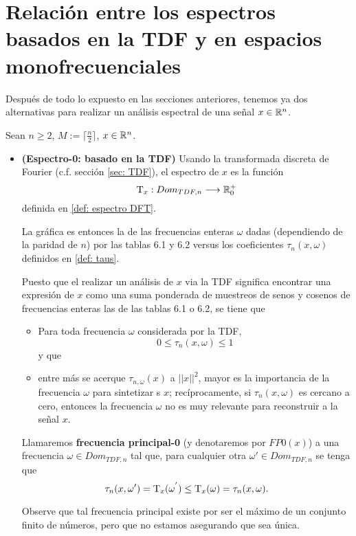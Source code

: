 \section{Relación entre los espectros basados en la TDF y en espacios monofrecuenciales}

Después de todo lo expuesto en las secciones anteriores, tenemos
ya dos alternativas para realizar un análisis
espectral de una señal $x \in \mathbb{R}^{n}$.

Sean $n \geq 2$, $M := \lceil \frac{n}{2} \rceil$, $x \in \mathbb{R}^{n}$.
\begin{itemize}
	\item \textbf{(Espectro-0: basado en la TDF)} 
	Usando la transformada discreta de Fourier
	(c.f. sección \ref{sec: TDF}),
	el espectro de $x$ es la función
	\[
	\mathrm{T}_{x}: Dom_{TDF, n} \longrightarrow \mathbb{R}^{+}_{0}
	\]	
	definida en \ref{def: espectro DFT}.
	
	La gráfica es entonces la de las frecuencias
	enteras $\omega$ dadas (dependiendo de la 
	paridad de $n$) por las
	tablas 6.1 y 6.2
	versus los coeficientes
	$\tau_{n}(x, \omega)$ definidos en
	\ref{def: taus}.
	
	Puesto que el realizar un análisis de 
	$x$ via la TDF significa encontrar una
	expresión de $x$ como una suma
	ponderada de muestreos de senos y cosenos
	de frecuencias enteras las de las tablas 6.1 o 6.2,
	se tiene que  
	\begin{itemize}
		\item Para toda frecuencia $\omega$ considerada
		por la TDF,
		\[
		0 \leq \tau_{n}(x, \omega) \leq 1
		\]
		y que
		\item entre más se acerque
		$\tau_{n, \omega}(x)$
		a $|| x ||^{2}$, mayor es la
		importancia de la frecuencia $\omega$ para
		sintetizar s $x$; recíprocamente, si 
		$\tau_{n}(x, \omega)$ es cercano a cero, entonces
		la frecuencia $\omega$ no es muy relevante para 
		reconstruir a la señal $x$.
	\end{itemize}
	\begin{defi}
	\label{def: FM0}
	Llamaremos \textbf{frecuencia principal-0}
	(y denotaremos por $FP0(x)$) 
	a una 
	frecuencia $\omega \in Dom_{TDF, n}$
	tal que, para cualquier otra $\omega' \in Dom_{TDF, n}$ 
	se tenga que 
	\[
	\tau_{n}(x, \omega') = \mathrm{T}_{x}(\omega^{'}) \leq
	\mathrm{T}_{x}(\omega) =  
	 \tau_{n}(x, \omega).
	\]
	\end{defi}
	Observe que tal frecuencia principal existe por ser 
	el máximo de un conjunto finito de números, pero que no 
	estamos asegurando que sea única. 
	

\end{itemize}
